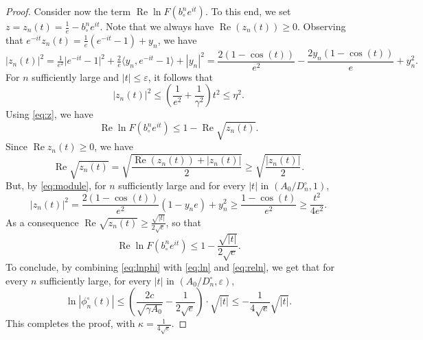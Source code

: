 \documentclass[11pt]{article}
\theoremstyle{definition}
\numberwithin{equation}{section}
\numberwithin{figure}{section}
\numberwithin{table}{section}
\renewcommand{\Re}{\operatorname{Re}}
\def\bcn{b_{\circ}^{n}}
\def\phicn{\phi^{\circ}_{n}}
\def\Dcn{D^{\circ}_{n}}
\renewcommand{\epsilon}{\varepsilon}
\begin{document}
\begin{proof}
Consider now the term $\Re \ln F( \bcn e^{it})$.
To this end, we set $z=z_{n}(t)=\tfrac{1}{e}-\bcn e^{it}$.
Note that we always have $\Re(z_n(t)) \ge 0$.
Observing that $e^{-it} z_{n}(t)= \tfrac{1}{e}(e^{-it}-1)+y_n$, we have
\begin{equation}
  \label{eq:module} |z_{n}(t)|^{2}=  \tfrac{1}{e^2} \big|e^{-it}-1\big|^2
  +\tfrac{2}{e} \big\langle y_n, e^{-it}-1 \big\rangle +|y_n|^2
  = \frac{2(1-\cos(t))}{e^{2}} -\frac{2 y_{n}(1-\cos(t))}{e}+y_{n}^{2}.
\end{equation}
For $n$ sufficiently large and $|t| \leq \epsilon$, it follows that
\begin{equation}
\label{ineq:module} |z_{n}(t)|^{2} \leq  \left( \frac{1}{e^{2}} + \frac{1}{\gamma^{2}} \right)  t^{2} \leq \eta^{2}.
\end{equation}
Using \eqref{eq:z}, we have
\[\Re \ln F( \bcn e^{it}) \leq 1-   \Re \sqrt{z_{n}(t)}.\]
Since $\Re z_{n}(t) \ge 0$, we have
\[ \Re \sqrt{z_{n}(t)}=\sqrt{\frac{\Re(z_n(t))+|z_n(t)|}{2}} \ge \sqrt{\frac{|z_n(t)|}{2}}. \]
But, by \eqref{eq:module}, for $n$ sufficiently large and  for every $|t|$ in $(A_{0}/\Dcn,1)$,
\[|z_{n}(t)|^{2} = \frac{2(1-\cos(t))}{e^{2}} (1-y_{n} e)+y_{n}^{2} \geq \frac{1-\cos(t)}{e^{2}} \geq  \frac{t^{2}}{4e^{2}}.\]
As a consequence $\Re \sqrt{z_{n}(t)} \geq \frac{\sqrt{|t|}}{2\sqrt{e}}$, so that
\begin{equation}
\label{eq:reln}\Re \ln F( \bcn e^{it}) \leq 1- \frac{\sqrt{|t|}}{2\sqrt{e}}.
\end{equation}
To conclude, by combining \eqref{eq:lnphi} with \eqref{eq:ln} and \eqref{eq:reln},
we get that for every $n$ sufficiently large, for every $|t|$ in $(A_{0}/\Dcn, \epsilon)$,
\[\ln|\phicn(t)| \leq \left(  \frac{2c}{\sqrt{\gamma A_{0}}}- \frac{1}{2\sqrt{e}} \right) \cdot \sqrt{|t|} \leq -\frac{1}{4\sqrt{e}} \sqrt{|t|}.\]
This completes the proof, with $\kappa= \frac{1}{4\sqrt{e}}$.
\end{proof}
\end{document}
